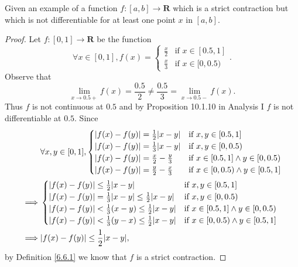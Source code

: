\begin{exercise}\label{ex 6.6.4}
    Given an example of a function \(f : [a, b] \to \mathbf{R}\) which is a strict contraction but which is not differentiable for at least one point \(x\) in \([a, b]\).
\end{exercise}

\begin{proof}
    Let \(f : [0, 1] \to \mathbf{R}\) be the function
    \[
        \forall x \in [0, 1], f(x) = \begin{cases}
            \frac{x}{2} & \text{if } x \in [0.5, 1] \\
            \frac{x}{3} & \text{if } x \in [0, 0.5)
        \end{cases}.
    \]
    Observe that
    \[
        \lim_{x \to 0.5+} f(x) = \frac{0.5}{2} \neq \frac{0.5}{3} = \lim_{x \to 0.5-} f(x).
    \]
    Thus \(f\) is not continuous at \(0.5\) and by Proposition 10.1.10 in Analysis I \(f\) is not differentiable at \(0.5\).
    Since
    \begin{align*}
                 & \forall x, y \in [0, 1], \begin{cases}
                                                \abs*{f(x) - f(y)} = \frac{1}{2} \abs*{x - y}  & \text{if } x, y \in [0.5, 1]                   \\
                                                \abs*{f(x) - f(y)} = \frac{1}{3} \abs*{x - y}  & \text{if } x, y \in [0, 0.5)                   \\
                                                \abs*{f(x) - f(y)} = \frac{x}{2} - \frac{y}{3} & \text{if } x \in [0.5, 1] \land y \in [0, 0.5) \\
                                                \abs*{f(x) - f(y)} = \frac{y}{2} - \frac{x}{3} & \text{if } x \in [0, 0.5) \land y \in [0.5, 1]
                                            \end{cases}     \\
        \implies & \begin{cases}
                       \abs*{f(x) - f(y)} \leq \frac{1}{2} \abs*{x - y}                            & \text{if } x, y \in [0.5, 1]                   \\
                       \abs*{f(x) - f(y)} = \frac{1}{3} \abs*{x - y} \leq \frac{1}{2} \abs*{x - y} & \text{if } x, y \in [0, 0.5)                   \\
                       \abs*{f(x) - f(y)} < \frac{1}{3} (x - y) \leq \frac{1}{2} \abs*{x - y}      & \text{if } x \in [0.5, 1] \land y \in [0, 0.5) \\
                       \abs*{f(x) - f(y)} < \frac{1}{3} (y - x) \leq \frac{1}{2} \abs*{x - y}      & \text{if } x \in [0, 0.5) \land y \in [0.5, 1]
                   \end{cases} \\
        \implies & \abs*{f(x) - f(y)} \leq \frac{1}{2} \abs*{x - y},
    \end{align*}
    by Definition \ref{6.6.1} we know that \(f\) is a strict contraction.
\end{proof}


